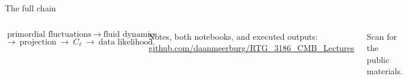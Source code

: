 \begin{frame}{The full chain}
\begin{columns}[c]
\[\text{primordial fluctuations}\ \longrightarrow\ \text{fluid dynamics}\]
\[\longrightarrow\ \text{projection}\ \longrightarrow\ C_\ell
\ \longrightarrow\ \text{data likelihood}.\]
\medskip\par Notes, both notebooks, and executed outputs:
\href{https://github.com/daanmeerburg/RTG_3186_CMB_Lectures}{github.com/daanmeerburg/RTG\_3186\_CMB\_Lectures}
\centering
{}
\par\smallskip\scriptsize Scan for the public materials.
\end{columns}
\end{frame}
